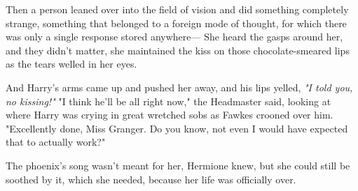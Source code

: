 Then a person leaned over into the field of vision and did something completely
strange, something that belonged to a foreign mode of thought, for which there
was only a single response stored anywhere\mbox{---}
\sbreak
She heard the gasps around her, and they didn't matter, she maintained the kiss
on those chocolate-smeared lips as the tears welled in her eyes.

And Harry's arms came up and pushed her away, and his lips yelled, \emph{"I
told you, no kissing!"}
\sbreak
"I think he'll be all right now," the Headmaster said, looking at where Harry
was crying in great wretched sobs as Fawkes crooned over him. "Excellently
done, Miss Granger. Do you know, not even I would have expected that to
actually work?"

The phoenix's song wasn't meant for her, Hermione knew, but she could still be
soothed by it, which she needed, because her life was officially over.
